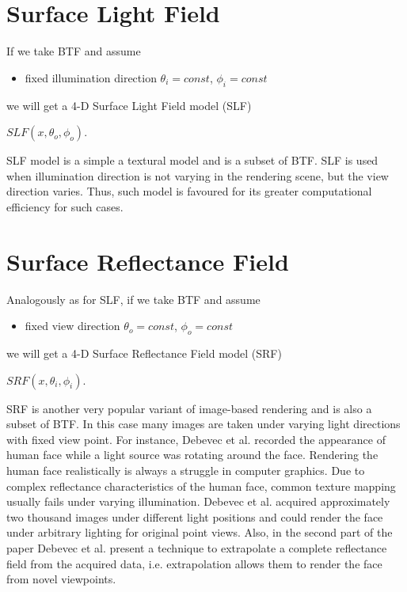 
\section{Surface Light Field}
\label{section:slf}
If we take BTF and assume

\begin{itemize}
\item fixed illumination direction $\theta_{i} = const$, $\phi_{i}=const$
\end{itemize}
we will get a 4-D Surface Light Field model (SLF)
 \begin{center}
$SLF(x,\theta_{o} ,\phi_{o})$.
 \end{center}
 
 SLF model is a simple a textural model and is a subset of BTF. 
 SLF is used when illumination direction is not varying in the rendering scene, but the view direction varies.
 Thus, such model is favoured for its greater computational efficiency for such cases.

\section{Surface Reflectance Field}
\label{section:srf}
Analogously as for SLF, if we take BTF and assume

\begin{itemize}
\item fixed view direction $\theta_{o} = const$, $\phi_{o}=const$
\end{itemize}
we will get a 4-D Surface Reflectance Field model (SRF)
 \begin{center}
$SRF(x,\theta_{i} ,\phi_{i})$.
 \end{center}
 

 SRF is another very popular variant of image-based rendering and is also a subset of BTF. 
 In this case many images are taken under varying light directions with fixed view point\cite{star2004}. 
 For instance, Debevec et al. \cite{debevec} recorded the appearance of human face while a
light source was rotating around the face. Rendering the human face realistically is always a struggle in computer graphics.
Due to complex reflectance characteristics of the human face, common texture mapping usually fails under varying illumination.
 Debevec et al. acquired approximately two thousand images under different light positions and could render the face under arbitrary lighting for original point views. 
 Also, in the second part of the paper Debevec et al. present a technique to extrapolate a complete reflectance field from the acquired data, i.e. extrapolation allows them to render the face from novel viewpoints.


